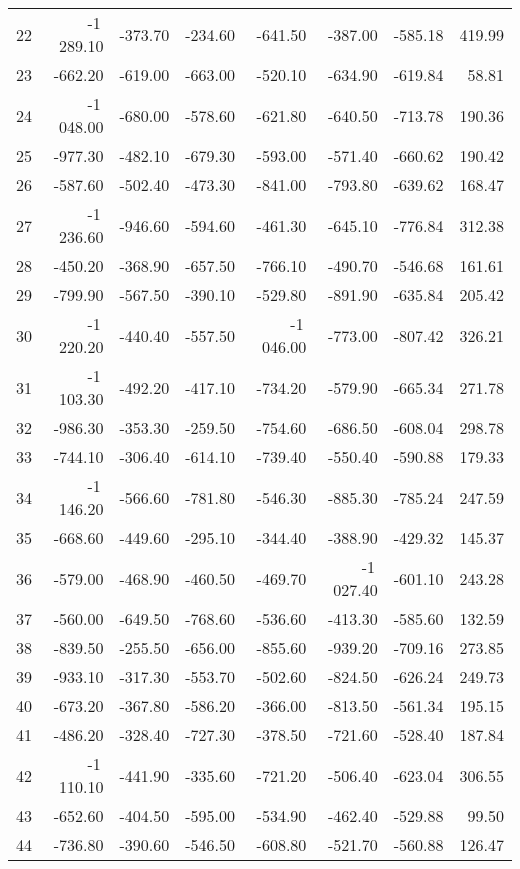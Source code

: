 \begin{longtable}{rrrrrrrr}
22 & -1\,289.10 & -373.70 & -234.60 & -641.50 & -387.00 & -585.18 & 419.99  \\
23 & -662.20 & -619.00 & -663.00 & -520.10 & -634.90 & -619.84 & 58.81  \\
24 & -1\,048.00 & -680.00 & -578.60 & -621.80 & -640.50 & -713.78 & 190.36  \\
25 & -977.30 & -482.10 & -679.30 & -593.00 & -571.40 & -660.62 & 190.42  \\
26 & -587.60 & -502.40 & -473.30 & -841.00 & -793.80 & -639.62 & 168.47  \\
27 & -1\,236.60 & -946.60 & -594.60 & -461.30 & -645.10 & -776.84 & 312.38  \\
28 & -450.20 & -368.90 & -657.50 & -766.10 & -490.70 & -546.68 & 161.61  \\
29 & -799.90 & -567.50 & -390.10 & -529.80 & -891.90 & -635.84 & 205.42  \\
30 & -1\,220.20 & -440.40 & -557.50 & -1\,046.00 & -773.00 & -807.42 & 326.21  \\
31 & -1\,103.30 & -492.20 & -417.10 & -734.20 & -579.90 & -665.34 & 271.78  \\
32 & -986.30 & -353.30 & -259.50 & -754.60 & -686.50 & -608.04 & 298.78  \\
33 & -744.10 & -306.40 & -614.10 & -739.40 & -550.40 & -590.88 & 179.33  \\
34 & -1\,146.20 & -566.60 & -781.80 & -546.30 & -885.30 & -785.24 & 247.59  \\
35 & -668.60 & -449.60 & -295.10 & -344.40 & -388.90 & -429.32 & 145.37  \\
36 & -579.00 & -468.90 & -460.50 & -469.70 & -1\,027.40 & -601.10 & 243.28  \\
37 & -560.00 & -649.50 & -768.60 & -536.60 & -413.30 & -585.60 & 132.59  \\
38 & -839.50 & -255.50 & -656.00 & -855.60 & -939.20 & -709.16 & 273.85  \\
39 & -933.10 & -317.30 & -553.70 & -502.60 & -824.50 & -626.24 & 249.73  \\
40 & -673.20 & -367.80 & -586.20 & -366.00 & -813.50 & -561.34 & 195.15  \\
41 & -486.20 & -328.40 & -727.30 & -378.50 & -721.60 & -528.40 & 187.84  \\
42 & -1\,110.10 & -441.90 & -335.60 & -721.20 & -506.40 & -623.04 & 306.55  \\
43 & -652.60 & -404.50 & -595.00 & -534.90 & -462.40 & -529.88 & 99.50  \\
44 & -736.80 & -390.60 & -546.50 & -608.80 & -521.70 & -560.88 & 126.47  \\

\end{longtable}
